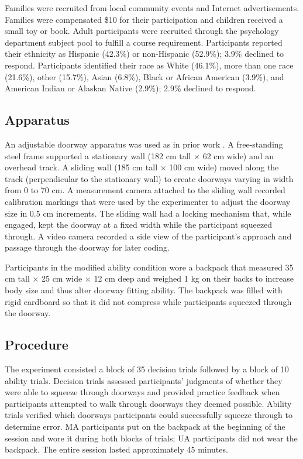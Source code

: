 \documentclass[a4paper,man,natbib,floatsintext,noextraspace]{apa6}
\begin{document}
Families were recruited from local community events and Internet advertisements. Families were compensated \$10 for their participation and children received a small toy or book. Adult participants were recruited through the psychology department subject pool to fulfill a course requirement. Participants reported their ethnicity as Hispanic (42.3\%) or non-Hispanic (52.9\%); 3.9\% declined to respond. Participants identified their race as White (46.1\%), more than one race (21.6\%), other (15.7\%), Asian (6.8\%), Black or African American (3.9\%), and American Indian or Alaskan Native (2.9\%); 2.9\% declined to respond.

\subsection{Apparatus}

An adjustable doorway apparatus was used as in prior work \citep{DoorwayLearning,Recal}. A free-standing steel frame supported a stationary wall (182 cm tall × 62 cm wide) and an overhead track. A sliding wall (185 cm tall × 100 cm wide) moved along the track (perpendicular to the stationary wall) to create doorways varying in width from 0 to 70 cm. A measurement camera attached to the sliding wall recorded calibration markings that were used by the experimenter to adjust the doorway size in 0.5 cm increments. The sliding wall had a locking mechanism that, while engaged, kept the doorway at a fixed width while the participant squeezed through. A video camera recorded a side view of the participant’s approach and passage through the doorway for later coding.

Participants in the modified ability condition wore a backpack that measured 35 cm tall × 25 cm wide × 12 cm deep and weighed 1 kg on their backs to increase body size and thus alter doorway fitting ability. The backpack was filled with rigid cardboard so that it did not compress while participants squeezed through the doorway. 

\subsection{Procedure}

The experiment consisted a block of 35 decision trials followed by a block of 10 ability trials. Decision trials assessed participants’ judgments of whether they were able to squeeze through doorways and provided practice feedback when participants attempted to walk through doorways they deemed possible. Ability trials verified which doorways participants could successfully squeeze through to determine error. MA participants put on the backpack at the beginning of the session and wore it during both blocks of trials; UA participants did not wear the backpack. The entire session lasted approximately 45 minutes. 
\end{document}
